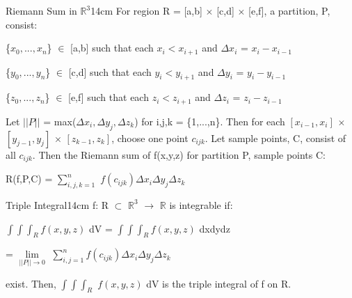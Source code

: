         \begin{definition}{Riemann Sum in $\mathbb{R}^3$}{14cm}
        For region R = [a,b] $\times$ [c,d] $\times$ [e,f],
        a {\color{lblue} partition}, P, consist:
        
        \hspace{0.5cm}
        \{$x_0,...,x_n$\} $\in$ [a,b] such that each $x_i < x_{i+1}$
        and $\Delta x_i$ = $x_i - x_{i-1}$
        
        \hspace{0.5cm}
        \{$y_0,...,y_n$\} $\in$ [c,d] such that each $y_i < y_{i+1}$
        and $\Delta y_i$ = $y_i - y_{i-1}$

        \hspace{0.5cm}
        \{$z_0,...,z_n$\} $\in$ [e,f] such that each $z_i < z_{i+1}$
        and $\Delta z_i$ = $z_i - z_{i-1}$

        Let $||P||$ = max($\Delta x_i,\Delta y_j,\Delta z_k$)
        for i,j,k = \{1,...,n\}.
        Then for each $[x_{i-1},x_i]$ $\times$ $[y_{j-1},y_j]$
        $\times$ $[z_{k-1},z_k]$,
        choose one point $c_{ijk}$.
        Let {\color{lblue} sample points}, C, consist of all $c_{ijk}$.
        Then the {\color{lblue} Riemann sum} of f(x,y,z) for partition P,
        sample points C:

        \hspace{0.5cm}
        R(f,P,C) = $\sum_{i,j,k=1}^n$ $f(c_{ijk}) \Delta x_i \Delta y_j \Delta z_k$
    \end{definition}

    \vspace{0.5cm}



    \begin{definition}{Triple Integral}{14cm}
        f: R $\subset$ $\mathbb{R}^3$ $\rightarrow$ $\mathbb{R}$
        is {\color{lblue} integrable} if:

        \hspace{0.5cm}
        $\int \int \int_R f(x,y,z)$ dV
        = $\int \int \int_R f(x,y,z)$ dxdydz

        \hspace{4.15cm}
        = $\underset{||P|| \rightarrow 0}{\lim}$
            $\sum_{i,j=1}^n f(c_{ijk}) \Delta x_i \Delta y_j \Delta z_k$

        exist. Then, $\int \int \int_R$ $f(x,y,z)$ dV
        is the {\color{lblue} triple integral} of f on R.
    \end{definition}

